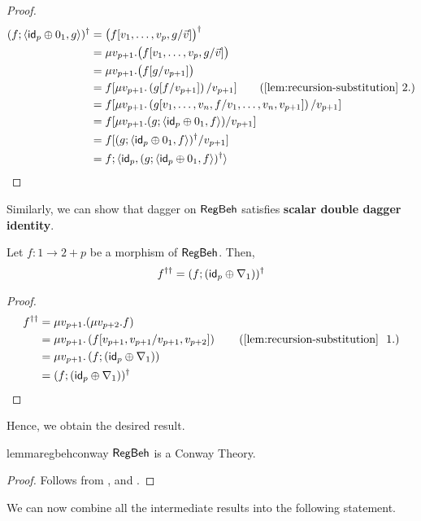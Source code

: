 \begin{proof}
\begin{align*}
(f ; \langle  \id_p \oplus 0_1 , g \rangle)^\dagger & = \big(f[v_1,\dots,v_p, g/\vec{v}]\big)^\dagger	
\\
& = \mu v_{p+1}.\big(f[v_1,\dots,v_p, g/\vec{v}]\big)
\\
& = \mu v_{p+1}.\big(f[g/v_{p+1}]\big)
\\
& = f[\mu v_{p+1}. \left(g[f/v_{p+1}]\right)/v_{p+1}] \tag{\Cref{lem:recursion-substitution}~2.}
\\
& = f[\mu v_{p+1}. \left(g[v_1,\dots,v_n,f/v_1,\dots,v_n,v_{p+1}]\right)/v_{p+1}]\\
& = f[\mu v_{p+1}. (g ;  \langle  \id_p \oplus 0_1 , f\rangle)/v_{p+1}]
\\
& = f[(g ;  \langle  \id_p \oplus 0_1 , f\rangle)^\dagger/v_{p+1}]
\\
& = f ; \langle \id_p, (g ;  \langle  \id_p \oplus 0_1 , f\rangle)^\dagger\rangle
\end{align*}
\end{proof}
Similarly, we can show that dagger on $\mathsf{RegBeh}$ satisfies \textbf{scalar double dagger identity}. 
\begin{lemma}\label{conway3}
Let $f \colon 1 \to 2 + p$ be a morphism of $\mathsf{RegBeh}$. Then,
		$$
		f^{\dagger\dagger} = (f ; (\mathsf{id}_p\oplus \nabla_1))^\dagger
		$$
\end{lemma}
\begin{proof}
\begin{align*}
f^{\dagger\dagger} &= \mu v_{p+1}.(\mu v_{p+2}.f)
\\
& = \mu v_{p+1}. \left(f [v_{p+1}, v_{p+1} / v_{p+1}, v_{p+2}]\right) \tag{\Cref{lem:recursion-substitution}~ 1.}
\\
& = \mu v_{p+1}. \left(f;(\id_p\oplus \nabla_1)\right)
\\
& = (f ; (\id_p\oplus \nabla_1))^\dagger
\end{align*}
\end{proof}
Hence, we obtain the desired result.
\begin{restatable}{lemma}{regbehconway}\label{lem:regbehconway}
$\mathsf{RegBeh}$ is a Conway Theory.	
\end{restatable}
\begin{proof}
	Follows from ,  and .
\end{proof}
We can now combine all the intermediate results into the following statement.
